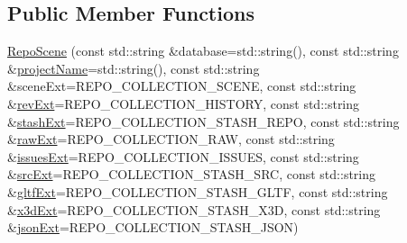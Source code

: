 \subsection*{Public Member Functions}
\begin{DoxyCompactItemize}
\item 
\hyperlink{classrepo_1_1core_1_1model_1_1_repo_scene_ae56a2c2f4932c2391fb6d9a31031f26c}{Repo\+Scene} (const std\+::string \&database=std\+::string(), const std\+::string \&\hyperlink{classrepo_1_1core_1_1model_1_1_abstract_graph_a8d6f646d8c8d0e5c14b31bbff17a1f1d}{project\+Name}=std\+::string(), const std\+::string \&scene\+Ext=R\+E\+P\+O\+\_\+\+C\+O\+L\+L\+E\+C\+T\+I\+O\+N\+\_\+\+S\+C\+E\+N\+E, const std\+::string \&\hyperlink{classrepo_1_1core_1_1model_1_1_repo_scene_ab33974cb8caec149fdd9743339f4d2ab}{rev\+Ext}=R\+E\+P\+O\+\_\+\+C\+O\+L\+L\+E\+C\+T\+I\+O\+N\+\_\+\+H\+I\+S\+T\+O\+R\+Y, const std\+::string \&\hyperlink{classrepo_1_1core_1_1model_1_1_repo_scene_a9e1ec4f9fa275647a75838361b3d2a5d}{stash\+Ext}=R\+E\+P\+O\+\_\+\+C\+O\+L\+L\+E\+C\+T\+I\+O\+N\+\_\+\+S\+T\+A\+S\+H\+\_\+\+R\+E\+P\+O, const std\+::string \&\hyperlink{classrepo_1_1core_1_1model_1_1_repo_scene_a19be566f3815da34dea4447f4d5b2dba}{raw\+Ext}=R\+E\+P\+O\+\_\+\+C\+O\+L\+L\+E\+C\+T\+I\+O\+N\+\_\+\+R\+A\+W, const std\+::string \&\hyperlink{classrepo_1_1core_1_1model_1_1_repo_scene_ade467377ddb29a8b7ea7347ed81ad0a4}{issues\+Ext}=R\+E\+P\+O\+\_\+\+C\+O\+L\+L\+E\+C\+T\+I\+O\+N\+\_\+\+I\+S\+S\+U\+E\+S, const std\+::string \&\hyperlink{classrepo_1_1core_1_1model_1_1_repo_scene_aaa568af1ee2cde77df38f4c3badb5981}{src\+Ext}=R\+E\+P\+O\+\_\+\+C\+O\+L\+L\+E\+C\+T\+I\+O\+N\+\_\+\+S\+T\+A\+S\+H\+\_\+\+S\+R\+C, const std\+::string \&\hyperlink{classrepo_1_1core_1_1model_1_1_repo_scene_a0de6d5d1c514db0e859b150feb312337}{gltf\+Ext}=R\+E\+P\+O\+\_\+\+C\+O\+L\+L\+E\+C\+T\+I\+O\+N\+\_\+\+S\+T\+A\+S\+H\+\_\+\+G\+L\+T\+F, const std\+::string \&\hyperlink{classrepo_1_1core_1_1model_1_1_repo_scene_ac55e20f143934e73afbca758b8d3d626}{x3d\+Ext}=R\+E\+P\+O\+\_\+\+C\+O\+L\+L\+E\+C\+T\+I\+O\+N\+\_\+\+S\+T\+A\+S\+H\+\_\+\+X3\+D, const std\+::string \&\hyperlink{classrepo_1_1core_1_1model_1_1_repo_scene_a979903ee1680863f4c67cf524bbc6e9f}{json\+Ext}=R\+E\+P\+O\+\_\+\+C\+O\+L\+L\+E\+C\+T\+I\+O\+N\+\_\+\+S\+T\+A\+S\+H\+\_\+\+J\+S\+O\+N)
\item 

\end{DoxyCompactItemize}
